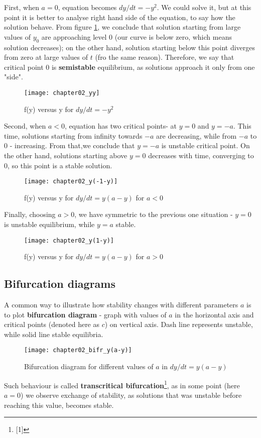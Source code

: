 First, when $a = 0$, equation becomes $dy/dt = -y^2$. We could solve it, but at this point it is better to analyse right hand side of the equation, to say how the solution behave. From figure \ref{fig: -yy}, we conclude that solution starting from large values of $y_0$ are approaching level $0$ (our curve is below zero, which means solution decreases); on the other hand, solution starting below this point diverges from zero at large values of $t$ (fro the same reason). Therefore, we say that critical point $0$ is \textbf{semistable} equilibrium, as solutions approach it only from one "side".

\begin{figure}[h]
\centering
\texttt{[image: chapter02\_yy]}
\caption{f(y) versus y for $dy/dt = -y^2$}
\label{fig: -yy}
\end{figure}

\clearpage
Second, when $a < 0$, equation has two critical points-  at $y = 0$ and $y = -a$. This time, solutions starting from infinity towards $-a$ are decreasing, while from $-a$ to $0$ - increasing. From that,we conclude that $y = -a$ is unstable critical point. On the other hand, solutions starting above $y = 0$ decreases with time, converging to $0$, so this point is a stable solution.

\begin{figure}[h]
\centering
\texttt{[image: chapter02\_y(-1-y)]}
\caption{f(y) versus y for $dy/dt = y(a - y)$ for $a < 0$}
\label{fig: y(-a-y)}
\end{figure}

Finally, choosing $a > 0$, we have symmetric to the previous one situation - $y = 0$ is unstable equilibrium, while $y = a$ stable.
\begin{figure}[h]
\centering
\texttt{[image: chapter02\_y(1-y)]}
\caption{f(y) versus y for $dy/dt = y(a - y)$ for $a > 0$}
\label{fig: y(a-y)}
\end{figure}

\subsection{Bifurcation diagrams}
A common way to illustrate how stability changes with different parameters $a$ is to plot \textbf{bifurcation diagram} - graph with values of $a$ in the horizontal axis and critical points (denoted here as $c$) on vertical axis. Dash line represents unstable, while solid line stable equilibria.

\begin{figure}[h]
\centering
\texttt{[image: chapter02\_bifr\_y(a-y)]}
\caption{Bifurcation diagram for different values of $a$ in $dy/dt = y(a-y)$}
\label{fig: bifr_y(a-y)}
\end{figure}
Such behaviour is called \textbf{transcritical bifurcation}\footnote{[1]}, as in some point (here $a = 0$) we observe exchange of stability, as solutions that was unstable before reaching this value, becomes stable.

